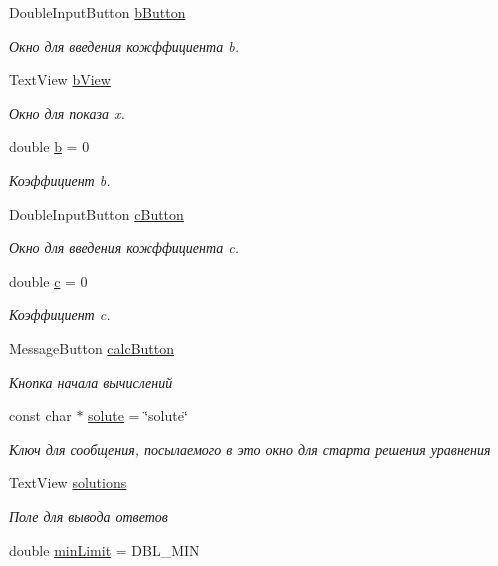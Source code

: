 \begin{DoxyCompactItemize}
DoubleInputButton \hyperlink{group___u_i_ga2a7741741b2199ac222556281f1474c0}{bButton}
\begin{DoxyCompactList}\small\item\em Окно для введения кожффициента b. \item\end{DoxyCompactList}\item 
TextView \hyperlink{group___u_i_ga5bbdd7ce43a736efddb212202d968229}{bView}
\begin{DoxyCompactList}\small\item\em Окно для показа x. \item\end{DoxyCompactList}\item 
double \hyperlink{group___u_i_ga4309ca79bdd7b0fedaedecb6e6e31f04}{b} = 0
\begin{DoxyCompactList}\small\item\em Коэффициент b. \item\end{DoxyCompactList}\item 
DoubleInputButton \hyperlink{group___u_i_ga22a74e860b6aa9a54dc402636fdb6b38}{cButton}
\begin{DoxyCompactList}\small\item\em Окно для введения кожффициента c. \item\end{DoxyCompactList}\item 
double \hyperlink{group___u_i_ga30d6d773e312cb1fefce1d66ec691ffa}{c} = 0
\begin{DoxyCompactList}\small\item\em Коэффициент c. \item\end{DoxyCompactList}\item 
MessageButton \hyperlink{group___u_i_ga1022c37f483309ed22237043b5454614}{calcButton}
\begin{DoxyCompactList}\small\item\em Кнопка начала вычислений \item\end{DoxyCompactList}\item 
const char $\ast$ \hyperlink{group___u_i_ga4e207ce02c4161839da7448825e51b42}{solute} = \char`\"{}solute\char`\"{}
\begin{DoxyCompactList}\small\item\em Ключ для сообщения, посылаемого в это окно для старта решения уравнения \item\end{DoxyCompactList}\item 
TextView \hyperlink{group___u_i_ga7acf2d96092ec6254f5dde5ca9fa5b27}{solutions}
\begin{DoxyCompactList}\small\item\em Поле для вывода ответов \item\end{DoxyCompactList}\item 
\hypertarget{group___u_i_ga0790e352f0b21712488f063fe52dbbed}{
double \hyperlink{group___u_i_ga0790e352f0b21712488f063fe52dbbed}{minLimit} = DBL\_\-MIN}
\label{group___u_i_ga0790e352f0b21712488f063fe52dbbed}


\end{DoxyCompactItemize}
